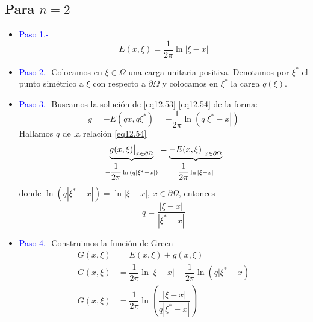 \documentclass[../main]{subfiles}
\begin{document}
    \subsection*{Para \texorpdfstring{$n=2$}{TEXT}}
    \begin{itemize}
        \item[] \textcolor{blue}{Paso 1.-}
        $$
        E(x,\xi)=\dfrac{1}{2\pi}\ln{|\xi-x|}
        $$
        \item[] \textcolor{blue}{Paso 2.-} Colocamos en $\xi \in \Omega$ una carga unitaria positiva. Denotamos por $\xi^*$ el punto simétrico a $\xi$ con respecto a $\partial \Omega$ y colocamos en $\xi^*$ la carga $q(\xi)$. 
        \item[] \textcolor{blue}{Paso 3.-} Buscamos la solución de \eqref{eq12.53}-\eqref{eq12.54} de la forma:
        $$
        g=-E(qx,q\xi^*)=-\dfrac{1}{2\pi}\ln{(q|\xi^*-x|)}
        $$
        Hallamos $q$ de la relación \eqref{eq12.54}
        $$
        \underbrace{g(x,\xi)\big{|}_{x\in\partial\Omega}}_{-\dfrac{1}{2\pi}\ln{(q|\xi^*-x|)}}=\underbrace{-E(x,\xi)\big{|}_{x\in\partial\Omega}}_{\dfrac{1}{2\pi}\ln{|\xi-x|}}
        $$
        donde $\ln{(q|\xi^*-x|)}=\ln{|\xi-x|}$, $x \in \partial \Omega$, entonces
        $$
        q=\dfrac{|\xi-x|}{|\xi^*-x|}
        $$
        \item[] \textcolor{blue}{Paso 4.-} Construimos la función de Green
        \begin{align*}
            G(x,\xi)&=E(x,\xi)+g(x,\xi) \\
            G(x,\xi)&=\dfrac{1}{2\pi}\ln{|\xi-x|}-\dfrac{1}{2\pi}\ln{(q|\xi^*-x)} \\
            G(x,\xi)&=\dfrac{1}{2\pi}\ln{\left(\dfrac{|\xi-x|}{q|\xi^*-x|}\right)}
        \end{align*}
    \end{itemize}
\end{document}
